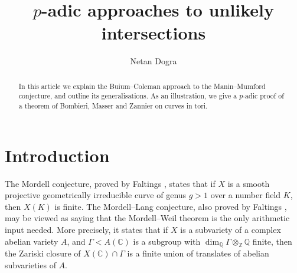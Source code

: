 \documentclass{amsart}
\def\Z{\mathbb Z}
\def\Q{\mathbb Q}
\def\C{\mathbb C}
\theoremstyle{definition}
\begin{document}
\title{$p$-adic approaches to unlikely intersections}
\author{Netan Dogra}
\maketitle
\begin{abstract}
In this article we explain the Buium--Coleman approach to the Manin--Mumford conjecture, and outline its generalisations. As an illustration, we give a $p$-adic proof of a theorem of Bombieri, Masser and Zannier on curves in tori.
\end{abstract}
\section{Introduction}
The Mordell conjecture, proved by Faltings \cite{faltings83}, states that if $X$ is a smooth projective geometrically irreducible curve of genus $g>1$ over a number field $K$, then $X(K)$ is finite. The Mordell--Lang conjecture, also proved by Faltings \cite{faltings:general}, may be viewed as saying that the Mordell--Weil theorem is the only arithmetic input needed. More precisely, it states that if $X$ is a subvariety of a complex abelian variety $A$, and $\Gamma <A(\mathbb{C})$ is a subgroup with $\dim _{\Q }\Gamma \otimes _{\Z }\Q $ finite, then the Zariski closure of $X(\C )\cap \Gamma $ is a finite union of translates of abelian subvarieties of $A$.
\end{document}
